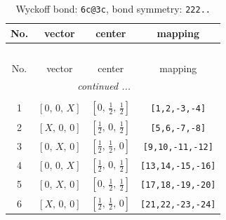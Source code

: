 \documentclass[fleqn,8pt]{jsarticle}
\begin{document}
\begin{longtable}{cccc}
\caption{Wyckoff bond: {\tt 6c@3c}, bond symmetry: {\tt 222..}}
 \\
 \hline \hline
No. & vector & center & mapping \\ \hline \endfirsthead

\multicolumn{3}{l}{\tablename\ \thetable{}} \\
 \hline \hline
No. & vector & center & mapping \\ \hline \endhead

 \hline \hline
\multicolumn{3}{r}{\footnotesize\it continued ...} \\ \endfoot

 \hline \hline
\multicolumn{3}{r}{} \\ \endlastfoot

1 & $\left[ 0,\, 0,\, X \right]$ & $\left[ 0,\, \frac{1}{2},\, \frac{1}{2} \right]$ & {\tt [1,2,-3,-4]} \\ \hline
2 & $\left[ X,\, 0,\, 0 \right]$ & $\left[ \frac{1}{2},\, 0,\, \frac{1}{2} \right]$ & {\tt [5,6,-7,-8]} \\ \hline
3 & $\left[ 0,\, X,\, 0 \right]$ & $\left[ \frac{1}{2},\, \frac{1}{2},\, 0 \right]$ & {\tt [9,10,-11,-12]} \\ \hline
4 & $\left[ 0,\, 0,\, X \right]$ & $\left[ \frac{1}{2},\, 0,\, \frac{1}{2} \right]$ & {\tt [13,14,-15,-16]} \\ \hline
5 & $\left[ 0,\, X,\, 0 \right]$ & $\left[ 0,\, \frac{1}{2},\, \frac{1}{2} \right]$ & {\tt [17,18,-19,-20]} \\ \hline
6 & $\left[ X,\, 0,\, 0 \right]$ & $\left[ \frac{1}{2},\, \frac{1}{2},\, 0 \right]$ & {\tt [21,22,-23,-24]} \\
\end{longtable}
\renewcommand{\arraystretch}{1.2}
\end{document}
